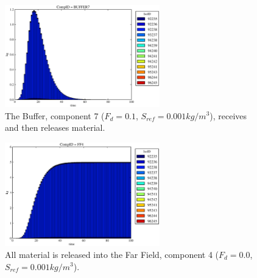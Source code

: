 \begin{figure}[ht]
\centering
  \includegraphics[width=0.6\textwidth]{./results/images/mcIII3.eps}
  \caption[Case MCIII Buffer Contaminants]{
    The Buffer, component 7 ($F_d=0.1$, $S_{ref}=0.001kg/m^3$), receives and then releases material.
    }
  \label{fig:mcIIIbuff}
\end{figure}

\begin{figure}[ht]
\centering
  \includegraphics[width=0.6\textwidth]{./results/images/mcIII0.eps}
  \caption[Case MCIII Far Field Contaminants.]{All material is released into
    the Far Field, component 4 ($F_d=0.0$, $S_{ref} = 0.001kg/m^3$).}
  \label{fig:mcIII}
\end{figure}

